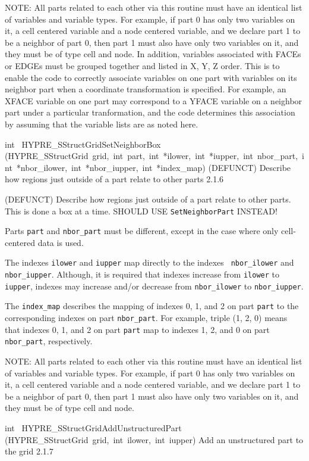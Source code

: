 \documentclass{article}
\begin{document}
\begin{cxxentry}
\begin{cxxentry}
\begin{cxxfunction}
\begin{cxxdoc}
NOTE: All parts related to each other via this routine must have an identical
list of variables and variable types.  For example, if part 0 has only two
variables on it, a cell centered variable and a node centered variable, and
we declare part 1 to be a neighbor of part 0, then part 1 must also have only
two variables on it, and they must be of type cell and node.  In addition,
variables associated with FACEs or EDGEs must be grouped together and listed
in X, Y, Z order.  This is to enable the code to correctly associate
variables on one part with variables on its neighbor part when a coordinate
transformation is specified.  For example, an XFACE variable on one part may
correspond to a YFACE variable on a neighbor part under a particular
tranformation, and the code determines this association by assuming that the
variable lists are as noted here.
\end{cxxdoc}
\end{cxxfunction}
\begin{cxxfunction}
{int\ }
        {HYPRE\_SStructGridSetNeighborBox}
        {(HYPRE\_SStructGrid\ grid,\ int\ part,\ int\ *ilower,\ int\ *iupper,\ int\ nbor\_part,\ int\ *nbor\_ilower,\ int\ *nbor\_iupper,\ int\ *index\_map)}
        {
(DEFUNCT) Describe how regions just outside of a part relate to other parts}
        {2.1.6}
\begin{cxxdoc}

(DEFUNCT) Describe how regions just outside of a part relate to other parts.
This is done a box at a time.  SHOULD USE {\tt SetNeighborPart} INSTEAD!

Parts {\tt part} and {\tt nbor\_part} must be different, except in the case
where only cell-centered data is used.

The indexes {\tt ilower} and {\tt iupper} map directly to the indexes {\tt
nbor\_ilower} and {\tt nbor\_iupper}.  Although, it is required that indexes
increase from {\tt ilower} to {\tt iupper}, indexes may increase and/or
decrease from {\tt nbor\_ilower} to {\tt nbor\_iupper}.

The {\tt index\_map} describes the mapping of indexes 0, 1, and 2 on part
{\tt part} to the corresponding indexes on part {\tt nbor\_part}.  For
example, triple (1, 2, 0) means that indexes 0, 1, and 2 on part {\tt part}
map to indexes 1, 2, and 0 on part {\tt nbor\_part}, respectively.

NOTE: All parts related to each other via this routine must have an identical
list of variables and variable types.  For example, if part 0 has only two
variables on it, a cell centered variable and a node centered variable, and
we declare part 1 to be a neighbor of part 0, then part 1 must also have only
two variables on it, and they must be of type cell and node.
\end{cxxdoc}
\end{cxxfunction}
\begin{cxxfunction}
{int\ }
        {HYPRE\_SStructGridAddUnstructuredPart}
        {(HYPRE\_SStructGrid\ grid,\ int\ ilower,\ int\ iupper)}
        {
Add an unstructured part to the grid}
        {2.1.7}
\begin{cxxdoc}


\end{cxxdoc}
\end{cxxfunction}
\end{cxxentry}
\end{cxxentry}
\end{document}
